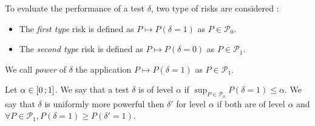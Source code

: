 	To evaluate the performance of a test $\delta$, two type of risks are considered :
	\begin{itemize}
		\item[\textbullet] The \emph{first type} risk is defined as $P \mapsto P(\delta = 1)$ as $P \in \mathcal{P}_0$.
		\item[\textbullet] The \emph{second type} risk is defined as $P \mapsto P(\delta = 0)$ as $P \in \mathcal{P}_1$.
	\end{itemize}
	We call \emph{power} of $\delta$ the application $P \mapsto P(\delta = 1)$ as $P \in \mathcal{P}_1$.

	\begin{defn}
		Let $\alpha \in \mathopen{}\mathclose{\left[0\mathclose{}\mathpunct{};1\right]}$.
		We say that a test $\delta$ is of level $\alpha$ if $\sup_{P \in \mathcal{P}_0} P(\delta = 1) \leq \alpha$.
		We say that $\delta$ is uniformly more powerful then $\delta'$ for level $\alpha$ if both are of level $\alpha$ and $\forall P \in \mathcal{P}_1, P(\delta = 1) \geq P(\delta' = 1)$.
	\end{defn}
